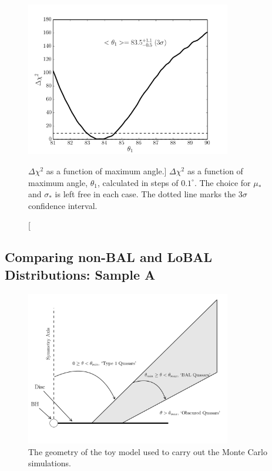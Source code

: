 \begin{figure}
\centering
\includegraphics[width=0.8\textwidth]{figures/ewpaper/chi2_o3.png}
\caption
[$\Delta \chi^2$ as a function of maximum angle.]
{
$\Delta \chi^2$ as a function of maximum angle, $\theta_1$, calculated in
steps of $0.1^\circ$. The choice for $\mu_*$ and $\sigma_*$ is 
left free in each case. The dotted line marks
the $3\sigma$ confidence interval.
}
\label{fig:chi2_curve}
\end{figure}

\subsection{Comparing non-BAL and LoBAL Distributions: Sample A}
\label{sec:bal_v_nonbal}

\begin{figure}
\centering
\includegraphics[width=0.8\textwidth]{figures/ewpaper/fig2_cartoon.png}
\caption
{
The geometry of the toy model used to carry out the Monte Carlo simulations.
}
\label{fig:cartoon}
\end{figure}

